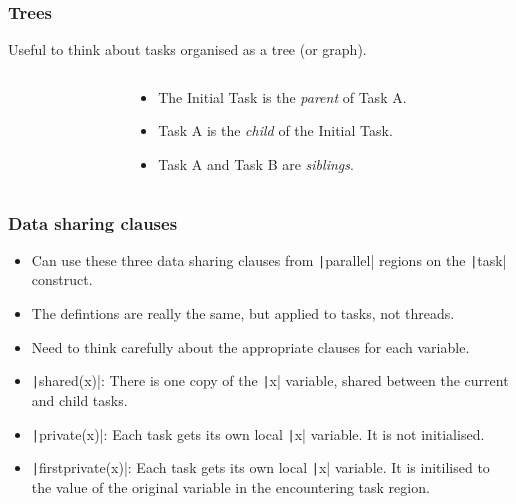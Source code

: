 \documentclass{beamer}
\begin{document}
\begin{frame}
\frametitle{Trees}
Useful to think about tasks organised as a tree (or graph).

\begin{columns}
\begin{column}{0.5\textwidth}
\end{column}

\begin{column}{0.5\textwidth}
\begin{itemize}
  \item The Initial Task is the \emph{parent} of Task A.
  \item Task A is the \emph{child} of the Initial Task.
  \item Task A and Task B are \emph{siblings}.
\end{itemize}
\end{column}
\end{columns}
\end{frame}

\begin{frame}
\frametitle{Data sharing clauses}
\begin{itemize}
  \item Can use these three data sharing clauses from \texttt|parallel| regions on the \texttt|task| construct.
  \item The defintions are really the same, but applied to tasks, not threads.
  \item Need to think carefully about the appropriate clauses for each variable.
  \item \texttt|shared(x)|: There is one copy of the \texttt|x| variable, shared between the current and child tasks.
  \item \texttt|private(x)|: Each task gets its own local \texttt|x| variable. It is not initialised.
  \item \texttt|firstprivate(x)|: Each task gets its own local \texttt|x| variable. It is initilised to the value of the original variable in the encountering task region.
\end{itemize}
\end{frame}
\end{document}
